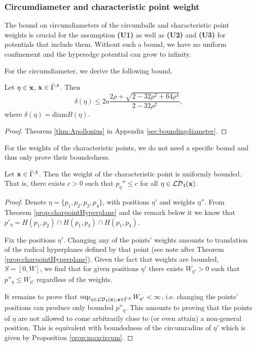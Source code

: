 \subsubsection{Circumdiameter and characteristic point weight}
The bound on circumdiameters of the circumballs and characteristic point weights is crucial for the assumption \textbf{(U1)} as well as \textbf{(U2)} and \textbf{(U3)} for potentials that include them. Without such a bound, we have no uniform confinement and the hyperedge potential can grow to infinity.\newline 

\noindent For the circumdiameter, we derive the following bound.
\begin{proposition}\label{prop:maxcircum}
	Let $\eta \in {\mathbf{x}}$, ${\mathbf{x}} \in \bar\Gamma^A$. Then 
	$$\delta(\eta) \leq  2a \frac{2\rho + \sqrt{2 - 32\rho^2 + 64 \rho^4}}{2-32\rho^2},$$
	where $\delta(\eta) = \mathrm{diam}B(\eta)$.
\end{proposition}
\begin{proof}
	Theorem \ref{thm:Apollonius} in Appendix \ref{sec:boundingdiameter}.
\end{proof}

\noindent For the weights of the characteristic points, we do not need a specific bound and thus only prove their boundedness.
\begin{proposition}\label{prop:maxPeta}
	Let ${\mathbf{x}} \in \bar\Gamma^A$. Then the weight of the characteristic point is uniformly bounded. That is, there exists $c>0$ such that $p_\eta'' \leq c$ for all $\eta \in \mathcal {LD}_4({\mathbf{x}})$. 
\end{proposition}
\begin{proof}
Denote $\eta=\{p_1,p_2,p_3,p_4\}$, with positions $\eta'$ and weights $\eta''$. From Theorem \ref{prop:charpointHyperplane} and the remark below it we know that $p'_\eta = H(p_1,p_2)\cap H(p_1,p_3) \cap H(p_1,p_4)$.

Fix the positions $\eta'$.  Changing any of the points' weights amounts to translation of the radical hyperplanes defined by that point (see note after Theorem \ref{prop:charpointHyperplane}). Given the fact that weights are bounded, $S=[0,W]$, we find that for given positions $\eta'$ there exists $W_{\eta'}>0$ such that $p''_\eta \leq W_{\eta'}$ regardless of the weights.

It remains to prove that $\sup_{\eta \in \mathcal {LD}_4({\mathbf{x}}),{\mathbf{x}} \in \bar\Gamma^A} W_{\eta'} < \infty$, i.e. changing the points' positions can produce only bounded $p''_\eta$. This amounts to proving that the points of $\eta$ are not allowed to come arbitrarily close to (or even attain) a non-general position. This is equivalent with boundedness of the circumradius of $\eta'$ which is given by Proposition \ref{prop:maxcircum}.
\end{proof}


